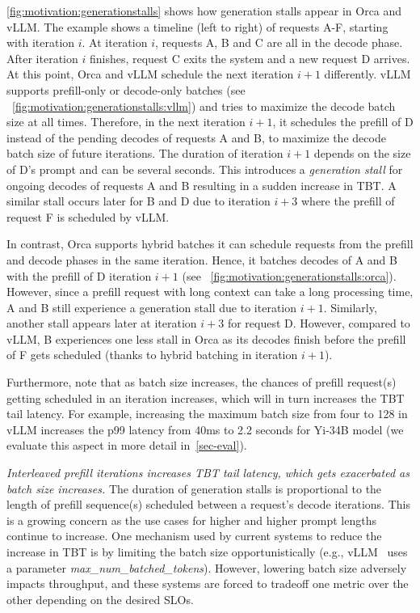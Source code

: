 \autoref{fig:motivation:generationstalls} shows how generation stalls appear in Orca and vLLM. The example shows a timeline (left to right) of requests A-F, starting with iteration $i$. At iteration $i$, requests A, B and C are all in the decode phase. After iteration $i$ finishes, request C exits the system and a new request D arrives. At this point, Orca and vLLM schedule the next iteration $i+1$ differently. vLLM supports prefill-only or decode-only batches (see ~\autoref{fig:motivation:generationstalls:vllm}) and tries to maximize the decode batch size at all times. Therefore, in the next iteration $i+1$, it schedules the prefill of D instead of the pending decodes of requests A and B, to maximize the decode batch size of future iterations. The duration of iteration $i+1$ depends on the size of D's prompt and can be several seconds. This introduces a \textit{generation stall} for ongoing decodes of requests A and B resulting in a sudden increase in TBT. A similar stall occurs later for B and D due to iteration $i+3$ where the prefill of request F is scheduled by vLLM.

In contrast, Orca supports hybrid batches \ie it can schedule requests from the prefill and decode phases in the same iteration. Hence, it batches decodes of A and B with the prefill of D iteration $i+1$ (see ~\autoref{fig:motivation:generationstalls:orca}). However, since a prefill request with long context can take a long processing time, A and B still experience a generation stall due to iteration $i+1$. Similarly, another stall appears later at iteration $i+3$ for request D. However, compared to vLLM, B experiences one less stall in Orca as its decodes finish before the prefill of F gets scheduled (thanks to hybrid batching in iteration $i+1$).

Furthermore, note that as batch size increases, the chances of prefill request(s) getting scheduled in an iteration increases, which will in turn increases the TBT tail latency. For example, increasing the maximum batch size from four to 128 in vLLM increases the p99 latency from 40ms to 2.2 seconds for Yi-34B model (we evaluate this aspect in more detail in~\autoref{sec-eval}).




 \textit{Interleaved prefill iterations increases TBT tail latency, which gets exacerbated as batch size increases.}
The duration of generation stalls is proportional to the length of prefill sequence(s) scheduled between a request's decode iterations. This is a growing concern as the use cases for higher and higher prompt lengths continue to increase. One mechanism used by current systems to reduce the increase in TBT is by limiting the batch size opportunistically (e.g., vLLM~\cite{vLLM:github} uses a parameter \textit{max\_num\_batched\_tokens}). However, lowering batch size adversely impacts throughput, and these systems are forced to tradeoff one metric over the other depending on the desired SLOs.













